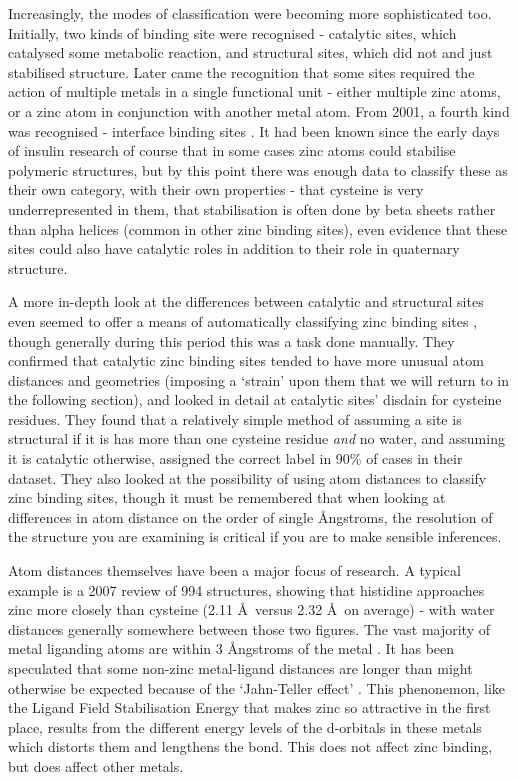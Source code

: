 Increasingly, the modes of classification were becoming more sophisticated too. Initially, two kinds of binding site were recognised - catalytic sites, which catalysed some metabolic reaction, and structural sites, which did not and just stabilised structure. Later came the recognition that some sites required the action of multiple metals in a single functional unit - either multiple zinc atoms, or a zinc atom in conjunction with another metal atom. From 2001, a fourth kind was recognised - interface binding sites \cite{auld2001zinc}. It had been known since the early days of insulin research of course that in some cases zinc atoms could stabilise polymeric structures, but by this point there was enough data to classify these as their own category, with their own properties - that cysteine is very underrepresented in them, that stabilisation is often done by beta sheets rather than alpha helices (common in other zinc binding sites), even evidence that these sites could also have catalytic roles in addition to their role in quaternary structure.

A more in-depth look at the differences between catalytic and structural sites even seemed to offer a means of automatically classifying zinc binding sites \cite{lee2008physical}, though generally during this period this was a task done manually. They confirmed that catalytic zinc binding sites tended to have more unusual atom distances and geometries (imposing a `strain' upon them that we will return to in the following section), and looked in detail at catalytic sites' disdain for cysteine residues. They found that a relatively simple method of assuming a site is structural if it is has more than one cysteine residue \textit{and} no water, and assuming it is catalytic otherwise, assigned the correct label in 90\% of cases in their dataset. They also looked at the possibility of using atom distances to classify zinc binding sites, though it must be remembered that when looking at differences in atom distance on the order of single {\AA}ngstroms, the resolution of the structure you are examining is critical if you are to make sensible inferences.

Atom distances themselves have been a major focus of research. A typical example is a 2007 review \cite{tamames2007analysis} of 994 structures, showing that histidine approaches zinc more closely than cysteine (2.11 \AA \ versus 2.32 \AA \ on average) - with water distances generally somewhere between those two figures. The vast majority of metal liganding atoms are within 3 {\AA}ngstroms of the metal \cite{dokmanic2008metals}. It has been speculated that some non-zinc metal-ligand distances are longer than might otherwise be expected because of the `Jahn-Teller effect' \cite{doi:10.1002/prot.21601}. This phenonemon, like the Ligand Field Stabilisation Energy that makes zinc so attractive in the first place, results from the different energy levels of the d-orbitals in these metals which distorts them and lengthens the bond. This does not affect zinc binding, but does affect other metals.

